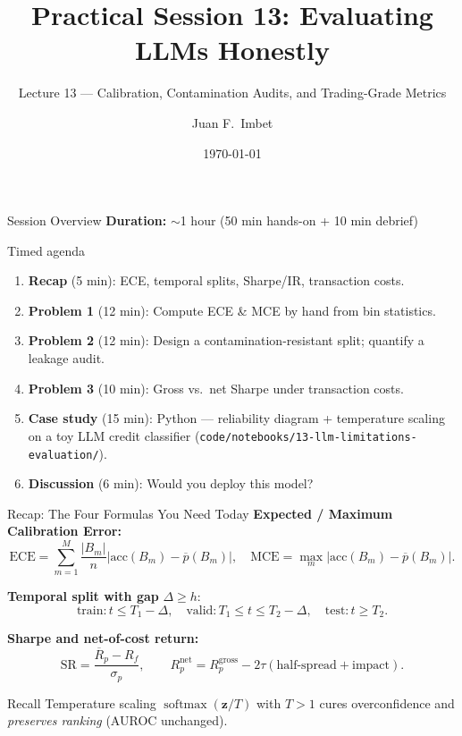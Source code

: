 \documentclass[9pt,t]{beamer}
\title{Practical Session 13: Evaluating LLMs Honestly}
\subtitle{Lecture 13 --- Calibration, Contamination Audits, and Trading-Grade Metrics}
\author{Juan F.\ Imbet}
\institute{Paris Dauphine -- PSL University}
\date{\today}
\begin{document}
\begin{frame}
  \titlepage
\end{frame}

\begin{frame}{Session Overview}
\textbf{Duration:} $\sim$1 hour (50 min hands-on + 10 min debrief)

\medskip
\begin{block}{Timed agenda}
\begin{enumerate}
  \item \textbf{Recap} (5 min): ECE, temporal splits, Sharpe/IR, transaction costs.
  \item \textbf{Problem 1} (12 min): Compute ECE \& MCE by hand from bin statistics.
  \item \textbf{Problem 2} (12 min): Design a contamination-resistant split; quantify
        a leakage audit.
  \item \textbf{Problem 3} (10 min): Gross vs.\ net Sharpe under transaction costs.
  \item \textbf{Case study} (15 min): Python --- reliability diagram + temperature
        scaling on a toy LLM credit classifier
        (\texttt{code/notebooks/13-llm-limitations-evaluation/}).
  \item \textbf{Discussion} (6 min): Would you deploy this model?
\end{enumerate}
\end{block}
\end{frame}

\begin{frame}{Recap: The Four Formulas You Need Today}
\textbf{Expected / Maximum Calibration Error:}
\[
  \text{ECE} = \sum_{m=1}^{M}\frac{|B_m|}{n}\bigl|\text{acc}(B_m)-\overline{p}(B_m)\bigr|,
  \quad
  \text{MCE} = \max_m \bigl|\text{acc}(B_m)-\overline{p}(B_m)\bigr|.
\]

\textbf{Temporal split with gap} $\Delta \geq h$:
\[
  \text{train}: t \leq T_1-\Delta,\quad
  \text{valid}: T_1\!\leq t \leq T_2-\Delta,\quad
  \text{test}: t \geq T_2.
\]

\textbf{Sharpe and net-of-cost return:}
\[
  \text{SR} = \frac{\overline{R}_p-R_f}{\sigma_p},\qquad
  R^{\text{net}}_p = R^{\text{gross}}_p - 2\tau(\text{half-spread}+\text{impact}).
\]

\medskip
\begin{block}{Recall}
Temperature scaling $\operatorname{softmax}(\mathbf{z}/T)$ with $T>1$ cures
overconfidence and \emph{preserves ranking} (AUROC unchanged).
\end{block}
\end{frame}
\end{document}
